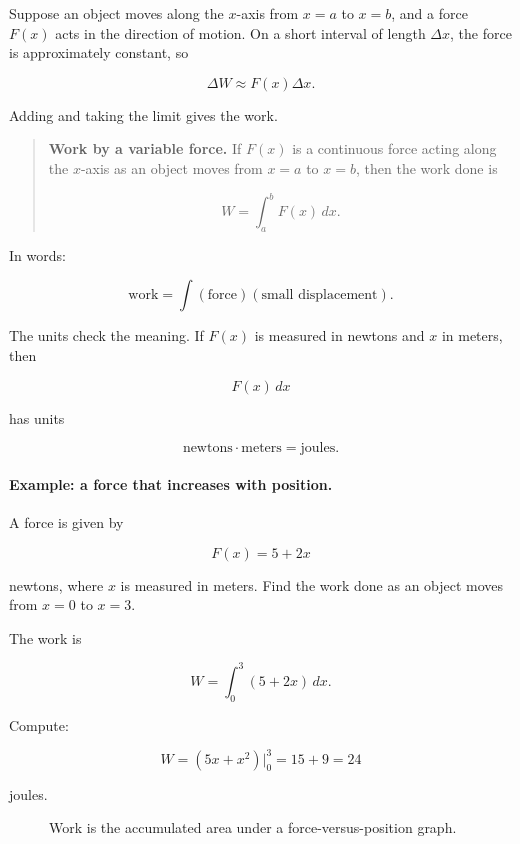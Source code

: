 Suppose an object moves along the \(x\)-axis from \(x=a\) to \(x=b\), and a force \(F(x)\)
acts in the direction of motion.  On a short interval of length \(\Delta x\), the force is
approximately constant, so

\[
\Delta W\approx F(x)\Delta x.
\]

Adding and taking the limit gives the work.

\begin{quote}
\textbf{Work by a variable force.}
If \(F(x)\) is a continuous force acting along the \(x\)-axis as an object moves from
\(x=a\) to \(x=b\), then the work done is

\[
\boxed{
W=\int_a^b F(x)\,dx.
}
\]
\end{quote}

In words:

\[
\boxed{
\text{work}=\int(\text{force})(\text{small displacement}).
}
\]

The units check the meaning.  If \(F(x)\) is measured in newtons and \(x\) in meters, then

\[
F(x)\,dx
\]

has units

\[
\text{newtons}\cdot\text{meters}=\text{joules}.
\]

\paragraph{Example: a force that increases with position.}
A force is given by

\[
F(x)=5+2x
\]

newtons, where \(x\) is measured in meters.  Find the work done as an object moves
from \(x=0\) to \(x=3\).

The work is

\[
W=\int_0^3 (5+2x)\,dx.
\]

Compute:

\[
W=
\left(5x+x^2\right)\Big|_0^3
=
15+9
=
\boxed{24}
\]

joules.

\begin{figure}[h]
\centering
{}
\caption{Work is the accumulated area under a force-versus-position graph.}
\label{fig:work-force-area}
\end{figure}


